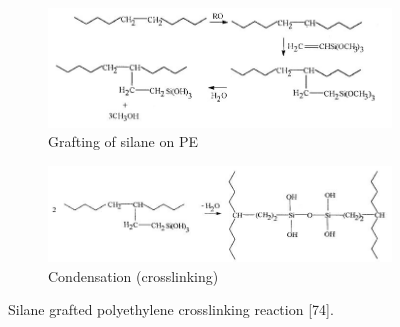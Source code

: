 \documentclass[12pt]{report}
\begin{document}
\begin{figure}[H]
\captionsetup[subfigure]{justification=raggedright}

\centering

\begin{subfigure}{.9\textwidth}
    \centering
    \includegraphics[width=\textwidth]{grafting_of_silane_on_pe.jpg}
    \caption{Grafting of silane on PE}
\end{subfigure}
\begin{subfigure}{.9\textwidth}
    \centering
    \includegraphics[width=\textwidth]{condensation.jpg}
    \caption{Condensation (crosslinking)}
\end{subfigure}

\caption{Silane grafted polyethylene crosslinking reaction [74].}
\label{ch3:figure:reaction}
\end{figure}
\end{document}
